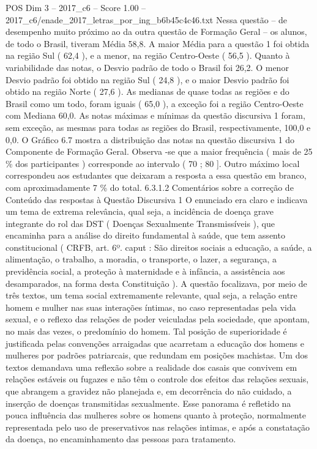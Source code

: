 \begin{textsample}{POS Dim 3 – 2017\_c6 – Score 1.00 – 2017\_c6/enade\_2017\_letras\_por\_ing\_b6b45c4c46.txt}
Nessa questão – de desempenho muito próximo ao da outra questão de Formação Geral – os alunos, de todo o Brasil, tiveram Média 58,8.
A maior Média para a questão 1 foi obtida na região Sul ( 62,4 ), e a menor, na região Centro-Oeste ( 56,5 ).
Quanto à variabilidade das notas, o Desvio padrão de todo o Brasil foi 26,2.
O menor Desvio padrão foi obtido na região Sul ( 24,8 ), e o maior Desvio padrão foi obtido na região Norte ( 27,6 ).
As medianas de quase todas as regiões e do Brasil como um todo, foram iguais ( 65,0 ), a exceção foi a região Centro-Oeste com Mediana 60,0.
As notas máximas e mínimas da questão discursiva 1 foram, sem exceção, as mesmas para todas as regiões do Brasil, respectivamente, 100,0 e 0,0.
O Gráfico 6.7 mostra a distribuição das notas na questão discursiva 1 do Componente de Formação Geral.
Observa -se que a maior frequência ( mais de 25 \% dos participantes ) corresponde ao intervalo ( 70 ; 80 ].
Outro máximo local correspondeu aos estudantes que deixaram a resposta a essa questão em branco, com aproximadamente 7 \% do total. 6.3.1.2 Comentários sobre a correção de Conteúdo das respostas à Questão Discursiva 1 O enunciado era claro e indicava um tema de extrema relevância, qual seja, a incidência de doença grave integrante do rol das DST ( Doenças Sexualmente Transmissíveis ), que encaminha para a análise do direito fundamental à saúde, que tem assento constitucional ( CRFB, art. 6º. caput : São direitos sociais a educação, a saúde, a alimentação, o trabalho, a moradia, o transporte, o lazer, a segurança, a previdência social, a proteção à maternidade e à infância, a assistência aos desamparados, na forma desta Constituição ).
A questão focalizava, por meio de três textos, um tema social extremamente relevante, qual seja, a relação entre homem e mulher nas suas interações íntimas, no caso representadas pela vida sexual, e o reflexo das relações de poder veiculadas pela sociedade, que apontam, no mais das vezes, o predomínio do homem.
Tal posição de superioridade é justificada pelas convenções arraigadas que acarretam a educação dos homens e mulheres por padrões patriarcais, que redundam em posições machistas.
Um dos textos demandava uma reflexão sobre a realidade dos casais que convivem em relações estáveis ou fugazes e não têm o controle dos efeitos das relações sexuais, que abrangem a gravidez não planejada e, em decorrência do não cuidado, a inserção de doenças transmitidas sexualmente.
Esse panorama é refletido na pouca influência das mulheres sobre os homens quanto à proteção, normalmente representada pelo uso de preservativos nas relações intimas, e após a constatação da doença, no encaminhamento das pessoas para tratamento.

\end{textsample}
